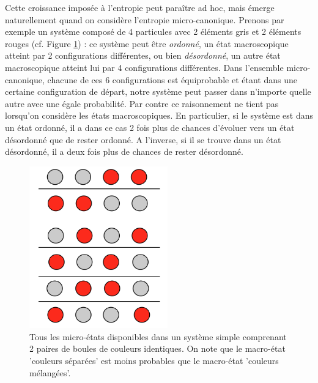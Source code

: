 Cette croissance imposée à l'entropie peut paraître ad hoc, mais émerge naturellement quand on considère l'entropie micro-canonique. Prenons par exemple un système composé de 4 particules avec 2 éléments gris et 2 éléments rouges (cf. Figure \ref{f:micro}) : ce système peut être \textit{ordonné}, un état macroscopique atteint par 2 configurations différentes, ou bien \textit{désordonné}, un autre état macroscopique atteint lui par 4 configurations différentes. Dans l'ensemble micro-canonique, chacune de ces 6 configurations est équiprobable et étant dans une certaine configuration de départ, notre système peut passer dans n'importe quelle autre avec une égale probabilité. Par contre ce raisonnement ne tient pas lorsqu'on considère les états macroscopiques.
En particulier, si le système est dans un état ordonné, il a dans ce cas 2 fois plus de chances d'évoluer vers un état désordonné que de rester ordonné.  A l'inverse, si il se trouve dans un état désordonné, il a deux fois plus de chances de rester désordonné.
\begin{figure}[htbp]
	\centering
		\includegraphics[height=7cm]{figs/micro.png}
	\caption[micro-états disponibles dans un système simple comprenant 2 paires de boules de couleurs identiques]{Tous les micro-états disponibles dans un système simple comprenant 2 paires de boules de couleurs identiques. On note que le macro-état 'couleurs séparées' est moins probables que le macro-état 'couleurs mélangées'.}
	\label{f:micro}
\end{figure}


